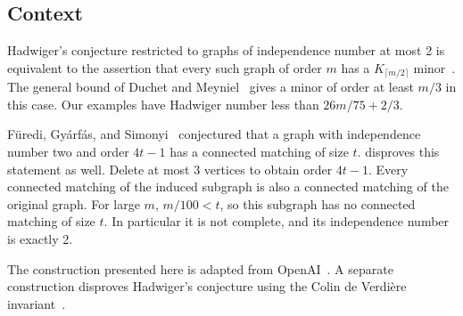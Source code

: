 \subsection{Context}

Hadwiger's conjecture restricted to graphs of independence number at most 2 is equivalent
to the assertion that every such graph of order \(m\) has a
\(K_{\lceil m/2\rceil}\) minor~\citep[Theorem~3.1]{pst2003}.
The general bound of Duchet and Meyniel~\citep{duchet1982} gives a minor
of order at least \(m/3\) in this case. Our examples have Hadwiger number
less than \(26m/75+2/3\).

F\"uredi, Gy\'arf\'as, and Simonyi~\citep{fgs2005} conjectured that a graph
with independence number two and order \(4t-1\) has a connected matching
of size \(t\).  disproves this statement as well. Delete
at most 3 vertices to obtain order \(4t-1\). Every connected matching
of the induced subgraph is also a connected matching of the original
graph. For large \(m\), \(m/100<t\), so this subgraph has no connected
matching of size \(t\). In particular it is not complete, and its
independence number is exactly 2.

The construction presented here is adapted from OpenAI~\citep{OpenAIHadwiger2026}.
A separate construction disproves Hadwiger's conjecture using the
Colin de Verdi\`ere invariant~\citep{OpenAIColinDeVerdiereCounterexample2026}.
